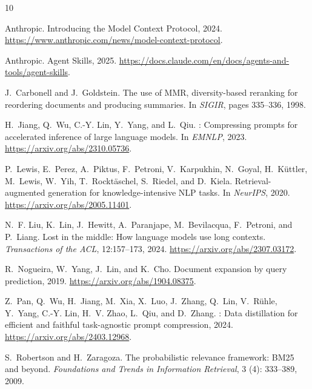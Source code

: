 \documentclass[11pt]{article}
\begin{document}

\begin{thebibliography}{10}
\providecommand{\natexlab}[1]{#1}

Anthropic.
\newblock Introducing the {M}odel {C}ontext {P}rotocol, 2024.
\newblock \url{https://www.anthropic.com/news/model-context-protocol}.

Anthropic.
\newblock Agent {S}kills, 2025.
\newblock \url{https://docs.claude.com/en/docs/agents-and-tools/agent-skills}.

J.~Carbonell and J.~Goldstein.
\newblock The use of {MMR}, diversity-based reranking for reordering documents and producing
  summaries.
\newblock In \emph{SIGIR}, pages 335--336, 1998.

H.~Jiang, Q.~Wu, C.-Y. Lin, Y.~Yang, and L.~Qiu.
: Compressing prompts for accelerated inference of large language models.
\newblock In \emph{EMNLP}, 2023.
\newblock \url{https://arxiv.org/abs/2310.05736}.

P.~Lewis, E.~Perez, A.~Piktus, F.~Petroni, V.~Karpukhin, N.~Goyal, H.~K\"uttler, M.~Lewis,
  W.~Yih, T.~Rockt\"aschel, S.~Riedel, and D.~Kiela.
\newblock Retrieval-augmented generation for knowledge-intensive {NLP} tasks.
\newblock In \emph{NeurIPS}, 2020.
\newblock \url{https://arxiv.org/abs/2005.11401}.

N.~F. Liu, K.~Lin, J.~Hewitt, A.~Paranjape, M.~Bevilacqua, F.~Petroni, and P.~Liang.
\newblock Lost in the middle: How language models use long contexts.
\newblock \emph{Transactions of the ACL}, 12:157--173, 2024.
\newblock \url{https://arxiv.org/abs/2307.03172}.

R.~Nogueira, W.~Yang, J.~Lin, and K.~Cho.
\newblock Document expansion by query prediction, 2019.
\newblock \url{https://arxiv.org/abs/1904.08375}.

Z.~Pan, Q.~Wu, H.~Jiang, M.~Xia, X.~Luo, J.~Zhang, Q.~Lin, V.~R\"uhle, Y.~Yang, C.-Y. Lin,
  H.~V. Zhao, L.~Qiu, and D.~Zhang.
: Data distillation for efficient and faithful task-agnostic prompt
  compression, 2024.
\newblock \url{https://arxiv.org/abs/2403.12968}.

S.~Robertson and H.~Zaragoza.
\newblock The probabilistic relevance framework: {BM25} and beyond.
\newblock \emph{Foundations and Trends in Information Retrieval}, 3 (4):
  333--389, 2009.

\end{thebibliography}
\end{document}
